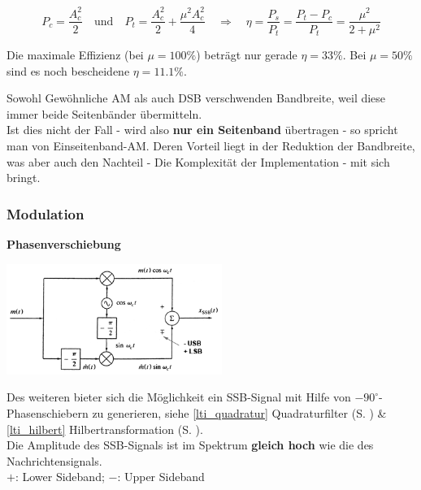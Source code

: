 $$ P_c = \frac{A_c^2}{2} \quad \text{und} \quad P_t = \frac{A_c^2}{2} + \frac{\mu^2 A_c^2}{4}
\quad \Longrightarrow \quad \eta = \frac{P_s}{P_t} = \frac{P_t - P_c}{P_t} = \frac{\mu^2}{2+\mu^2} $$

Die maximale Effizienz (bei $\mu = 100\% $) beträgt nur gerade $ \eta = 33\% $. Bei $\mu = 50\% $
sind es noch bescheidene $\eta = 11.1\% $.

Sowohl Gewöhnliche AM als auch DSB verschwenden Bandbreite, weil diese immer beide Seitenbänder
übermitteln. \\
Ist dies nicht der Fall - wird also \textbf{nur ein Seitenband} übertragen - so spricht man von
Einseitenband-AM. Deren Vorteil liegt in der Reduktion der Bandbreite, was aber auch den Nachteil
- Die Komplexität der Implementation - mit sich bringt.

\subsubsection{Modulation}
\textbf{Phasenverschiebung }  \\
\begin{minipage}[t][3.7cm][c]{7.5cm}
    \includegraphics[width=7cm]{bilder/am_ssb_modulationPhasenshifter.png}
\end{minipage}
\begin{minipage}[t][3.7cm][c]{10.5cm}	
	Des weiteren bieter sich die Möglichkeit ein SSB-Signal mit Hilfe von 
	$ - 90^{\circ} $-Phasenschiebern zu generieren, {\small siehe
	\ref{lti_quadratur} Quadraturfilter (S. \pageref{lti_quadratur}) \&
	\ref{lti_hilbert} Hilbertransformation (S. \pageref{lti_hilbert})}.\\
	Die Amplitude des SSB-Signals ist im Spektrum \textbf{gleich hoch} wie die des
	Nachrichtensignals.\\ 
	$+$: Lower Sideband; \qquad $-$: Upper Sideband
\end{minipage}

